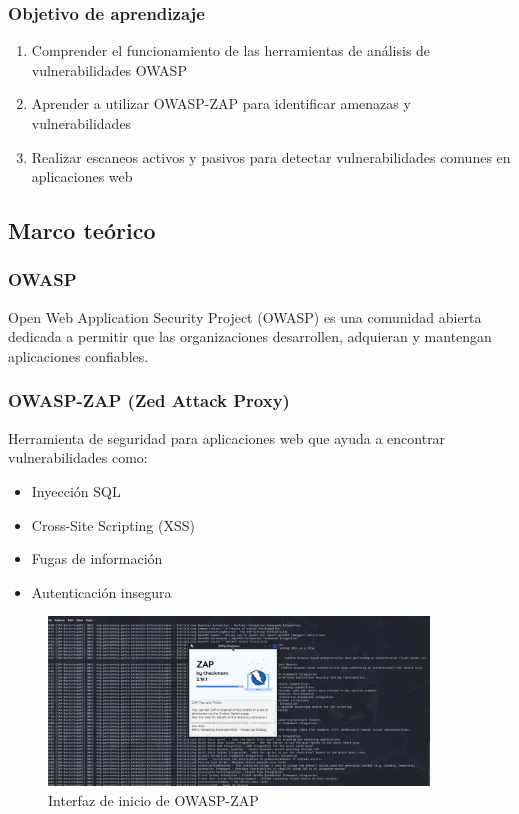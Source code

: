 \documentclass[12pt,a4paper]{article}
\begin{document}
\subsubsection{Objetivo de aprendizaje}
\begin{enumerate}
    \item Comprender el funcionamiento de las herramientas de análisis de vulnerabilidades OWASP
    \item Aprender a utilizar OWASP-ZAP para identificar amenazas y vulnerabilidades
    \item Realizar escaneos activos y pasivos para detectar vulnerabilidades comunes en aplicaciones web
\end{enumerate}

\subsection{Marco teórico}

\subsubsection{OWASP}
Open Web Application Security Project (OWASP) es una comunidad abierta dedicada a permitir que las organizaciones desarrollen, adquieran y mantengan aplicaciones confiables.

\subsubsection{OWASP-ZAP (Zed Attack Proxy)}
Herramienta de seguridad para aplicaciones web que ayuda a encontrar vulnerabilidades como:
\begin{itemize}
    \item Inyección SQL
    \item Cross-Site Scripting (XSS)
    \item Fugas de información
    \item Autenticación insegura
\end{itemize}

\begin{figure}[H]
\centering
\includegraphics[width=0.9\textwidth]{zap_inicando.png}
\caption{Interfaz de inicio de OWASP-ZAP}
\label{fig:zap_inicio}
\end{figure}
\end{document}
